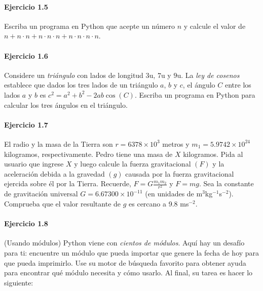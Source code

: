 \paragraph{\color{DarkBlue}Ejercicio 1.5}
Escriba un programa en Python que acepte un número $n$ y
calcule el valor de
\begin{math}
	n +
	n\cdot n +
	n\cdot n\cdot n +
	n\cdot n\cdot n\cdot n
\end{math}.

\paragraph{\color{DarkBlue}Ejercicio 1.6}
Considere un \emph{triángulo} con lados de longitud $3$u, $7$u y
$9$u.
La \emph{ley de cosenos} establece que dados los tres lados de un
triángulo $a$, $b$ y $c$, el ángulo $C$ entre los lados $a$ y $b$ es
\begin{math}
	c^{2}=
	a^{2}+
	b^{2}-
	2ab\cos\left(C\right)
\end{math}.
Escriba un programa en Python para calcular los tres ángulos en el
triángulo.

\paragraph{\color{DarkBlue}Ejercicio 1.7}
El radio y la masa de la Tierra son
\begin{math}
	r =
	6378\times10^{3}
\end{math}
metros y
\begin{math}
	m_{1}=
	5.9742\times10^{24}
\end{math}
kilogramos, respectivamente.
Pedro tiene una masa de $X$ kilogramos.
Pida al usuario que ingrese $X$ y luego calcule la fuerza
gravitacional $\left(F\right)$ y la aceleración debida a la gravedad
$\left(g\right)$ causada por la fuerza gravitacional ejercida sobre
él por la Tierra.
Recuerde, $F=G\frac{m_{1}m_{2}}{r^{2}}$ y $F=mg$.
Sea la constante de gravitación universal $G=6.67300\times 10^{-11}$
(en unidades de m$^{3}$kg$^{-1}$s$^{-2}$).
Comprueba que el valor resultante de $g$ es cercano a 9.8 ms$^{-2}$.

\paragraph{\color{DarkBlue}Ejercicio 1.8}
(Usando módulos) Python viene con \emph{cientos de módulos}.
Aquí hay un desafío para ti: encuentre un módulo que pueda importar
que genere la fecha de hoy para que pueda imprimirlo.
Use su motor de búsqueda favorito para obtener ayuda para encontrar
qué módulo necesita y cómo usarlo.
Al final, su tarea es hacer lo siguiente:
\begin{listing}[ht!]
	\inputminted{python}{1.8.py}
\end{listing}


